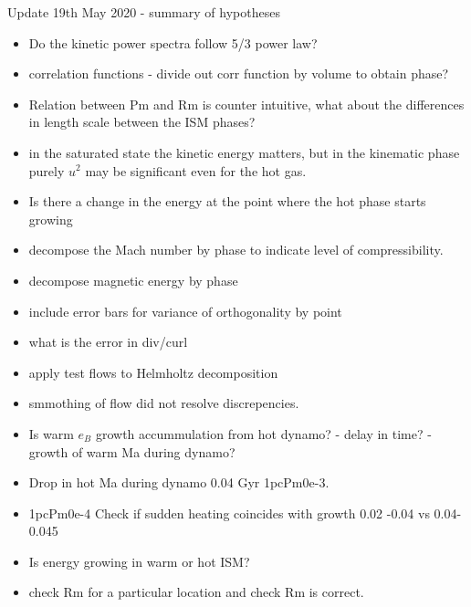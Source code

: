 \documentclass[iop,apj,numberedappendix,twocolappendix]{emulateapj}
\begin{document}
Update 19th May 2020 - summary of hypotheses
\begin{itemize}
\item Do the kinetic power spectra follow 5/3 power law? 
\item correlation functions - divide out corr function by volume to obtain phase?
\item Relation between Pm and Rm is counter intuitive, what about the differences in length scale between the ISM phases?
\item in the saturated state the kinetic energy matters, but in the kinematic phase purely $u^2$ may be significant even for the hot gas.
\item Is there a change in the energy at the point where the hot phase starts growing 
\item decompose the Mach number by phase to indicate level of compressibility.
\item decompose magnetic energy by phase
\item include error bars for variance of orthogonality by point
\item what is the error in div/curl
\item apply test flows to Helmholtz decomposition
\item smmothing of flow did not resolve discrepencies.
\item Is warm $e_B$ growth accummulation from hot dynamo? - delay in time? - growth of warm Ma during dynamo?
\item Drop in hot Ma during dynamo 0.04 Gyr 1pcPm0e-3. 
\item 1pcPm0e-4 Check if sudden heating coincides with growth 0.02 -0.04 vs 0.04-0.045
\item Is energy growing in warm or hot ISM?
\item check Rm for a particular location and check Rm is correct.
\end{itemize}
\end{document}

